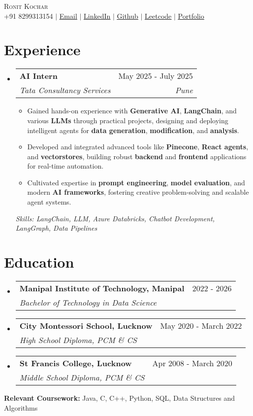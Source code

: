 \documentclass[letterpaper,10pt]{article}
\makeatletter
\newcommand{\resumeItem}[1]{
  \item\footnotesize{
    {#1 \vspace{-1pt}}
  }
}
\newcommand{\resumeSubheading}[4]{
  \vspace{-1pt}\item
    \begin{tabular*}{0.97\textwidth}[t]{l@{\extracolsep{\fill}}r}
      \textbf{#1} & #2 \\
      \textit{\footnotesize#3} & \textit{\footnotesize #4} \\
    \end{tabular*}\vspace{-5pt}
}
\newcommand{\resumeSubHeadingListStart}{\begin{itemize}[leftmargin=0.15in, label={}]}
\newcommand{\resumeSubHeadingListEnd}{\end{itemize}}
\newcommand{\resumeItemListStart}{\begin{itemize}}
\newcommand{\resumeItemListEnd}{\end{itemize}\vspace{-3pt}}
\makeatother
\begin{document}
\begin{center}
    {\Huge \scshape Ronit Kochar} \\[1pt]
    \small +91 8299313154 $|$ \href{mailto:ronitkochar2001@gmail.com}{\underline{Email}} $|$
    \href{https://www.linkedin.com/in/ronit-kochar-0a70841b7/}{\underline{LinkedIn}} $|$
    \href{https://github.com/RonitKochar}{\underline{Github}} $|$
    \href{https://leetcode.com/u/RonitKochar/}{\underline{Leetcode}} $|$
    \href{https://ronitkochar.github.io/Portfolio/}{\underline{Portfolio}}
\end{center}

\section{Experience}
  \resumeSubHeadingListStart
      \resumeSubheading
      {AI Intern}{May 2025 - July 2025}
      {Tata Consultancy Services}{Pune}
      \resumeItemListStart
        \resumeItem{Gained hands-on experience with \textbf{Generative AI}, \textbf{LangChain}, and various \textbf{LLMs} through practical projects, designing and deploying intelligent agents for \textbf{data generation}, \textbf{modification}, and \textbf{analysis}.}
        \resumeItem{Developed and integrated advanced tools like \textbf{Pinecone}, \textbf{React agents}, and \textbf{vectorstores}, building robust \textbf{backend} and \textbf{frontend} applications for real-time automation.}
        \resumeItem{Cultivated expertise in \textbf{prompt engineering}, \textbf{model evaluation}, and modern \textbf{AI frameworks}, fostering creative problem-solving and scalable agent systems.}
      \resumeItemListEnd

      {\small\textit{Skills: LangChain, LLM, Azure Databricks, Chatbot Development, LangGraph, Data Pipelines}}
  \resumeSubHeadingListEnd

\section{Education}
  \resumeSubHeadingListStart
    \resumeSubheading
      {Manipal Institute of Technology, Manipal}{2022 - 2026}
      {Bachelor of Technology in Data Science}{}
    \resumeSubheading
      {City Montessori School, Lucknow}{May 2020 - March 2022}
      {High School Diploma, PCM \& CS}{}
    \resumeSubheading
      {St Francis College, Lucknow}{Apr 2008 - March 2020}
      {Middle School Diploma, PCM \& CS}{}
  \resumeSubHeadingListEnd
  \vspace*{0.1cm}
  \textbf{Relevant Coursework:} Java, C, C++, Python, SQL, Data Structures and Algorithms
\end{document}
